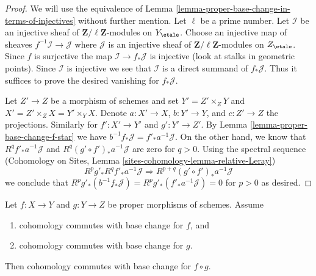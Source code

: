 \begin{proof}
We will use the equivalence of
Lemma \ref{lemma-proper-base-change-in-terms-of-injectives}
without further mention. Let $\ell$ be a prime number.
Let $\mathcal{I}$ be an injective sheaf of
$\mathbf{Z}/\ell\mathbf{Z}$-modules on $Y_\etale$.
Choose an injective map of sheaves $f^{-1}\mathcal{I} \to \mathcal{J}$
where $\mathcal{J}$ is an injective sheaf of
$\mathbf{Z}/\ell\mathbf{Z}$-modules on $Z_\etale$.
Since $f$ is surjective the map $\mathcal{I} \to f_*\mathcal{J}$
is injective (look at stalks in geometric points).
Since $\mathcal{I}$ is injective we see that $\mathcal{I}$
is a direct summand of $f_*\mathcal{J}$. Thus it suffices
to prove the desired vanishing for $f_*\mathcal{J}$.

\medskip\noindent
Let $Z' \to Z$ be a morphism of schemes and set
$Y' = Z' \times_Z Y$ and $X' = Z' \times_Z X = Y' \times_ Y X$.
Denote $a : X' \to X$, $b : Y' \to Y$, and $c : Z' \to Z$ the
projections. Similarly for $f' : X' \to Y'$ and $g' : Y' \to Z'$.
By Lemma \ref{lemma-proper-base-change-f-star} we have
$b^{-1}f_*\mathcal{J} = f'_*a^{-1}\mathcal{J}$.
On the other hand, we know that $R^qf'_*a^{-1}\mathcal{J}$ and
$R^q(g' \circ f')_*a^{-1}\mathcal{J}$ are zero for $q > 0$.
Using the spectral sequence
(Cohomology on Sites, Lemma \ref{sites-cohomology-lemma-relative-Leray})
$$
R^pg'_* R^qf'_* a^{-1}\mathcal{J} \Rightarrow
R^{p + q}(g' \circ f')_* a^{-1}\mathcal{J}
$$
we conclude that
$ R^pg'_*(b^{-1}f_*\mathcal{J}) = R^pg'_*(f'_*a^{-1}\mathcal{J}) = 0$
for $p > 0$ as desired.
\end{proof}

\begin{lemma}
\label{lemma-composition}
Let $f : X \to Y$ and $g : Y \to Z$ be proper morphisms of schemes. Assume
\begin{enumerate}
\item cohomology commutes with base change for $f$, and
\item cohomology commutes with base change for $g$.
\end{enumerate}
Then cohomology commutes with base change for $f \circ g$.
\end{lemma}

